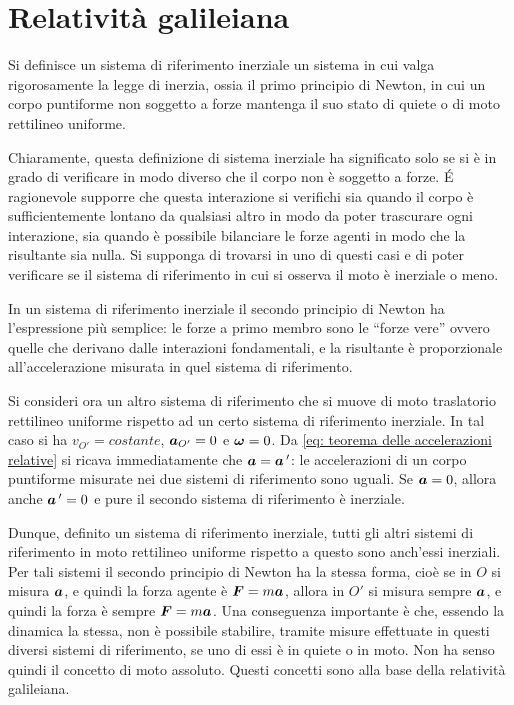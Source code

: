 \section{Relatività galileiana}
Si definisce un sistema di riferimento inerziale un sistema in cui valga rigorosamente la legge di inerzia, ossia il primo principio di Newton, in cui un corpo puntiforme non soggetto a forze mantenga il suo stato di quiete o di moto rettilineo uniforme. 

Chiaramente, questa definizione di sistema inerziale ha significato solo se si è in grado di verificare in modo diverso che il corpo non è soggetto a forze. \'E ragionevole supporre che questa interazione si verifichi sia quando il corpo è sufficientemente lontano da qualsiasi altro in modo da poter trascurare ogni interazione, sia quando è possibile bilanciare le forze agenti in modo che la risultante sia nulla. Si supponga di trovarsi in uno di questi casi e di poter verificare se il sistema di riferimento in cui si osserva il moto è inerziale o meno. 

In un sistema di riferimento inerziale il secondo principio di Newton ha l'espressione più semplice: le forze a primo membro sono le ``forze vere'' ovvero quelle che derivano dalle interazioni fondamentali, e la risultante è proporzionale all'accelerazione misurata in quel sistema di riferimento.

Si consideri ora un altro sistema di riferimento che si muove di moto traslatorio rettilineo uniforme rispetto ad un certo sistema di riferimento inerziale. In tal caso si ha $v_{O'}=costante$, $\bm{a}_{O'}=0$ e $\bm{\omega}=0$. Da \eqref{eq: teorema delle accelerazioni relative} si ricava immediatamente che $\bm{a}=\bm{a}\,'$: le accelerazioni di un corpo puntiforme misurate nei due sistemi di riferimento sono uguali. Se $\bm{a}=0$, allora anche $\bm{a}\,'=0$ e pure il secondo sistema di riferimento è inerziale. 

Dunque, definito un sistema di riferimento inerziale, tutti gli altri sistemi di riferimento in moto rettilineo uniforme rispetto a questo sono anch'essi inerziali. Per tali sistemi il secondo principio di Newton ha la stessa forma, cioè se in $O$ si misura $\bm{a}$, e quindi la forza agente è $\bm{F}=m\bm{a}$, allora in $O'$ si misura sempre $\bm{a}$, e quindi la forza è sempre $\bm{F}=m\bm{a}$. Una conseguenza importante è che, essendo la dinamica la stessa, non è possibile stabilire, tramite misure effettuate in questi diversi sistemi di riferimento, se uno di essi è in quiete o in moto. Non ha senso quindi il concetto di moto assoluto. Questi concetti sono alla base della relatività galileiana. 

